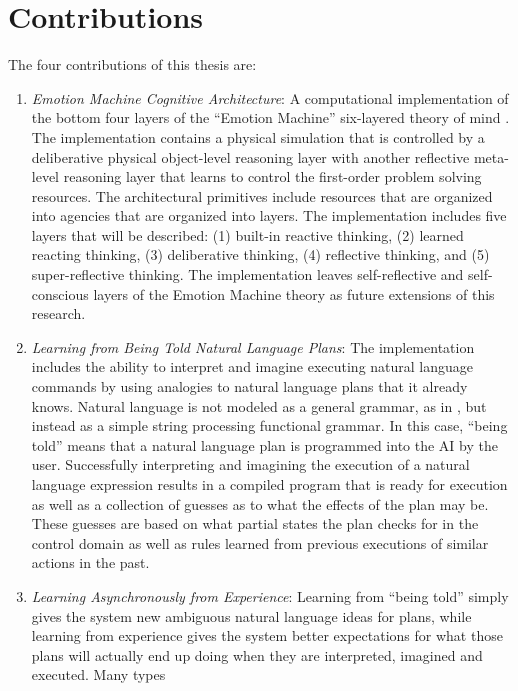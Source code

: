 \section{Contributions}

The four contributions of this thesis are:
\begin{enumerate}
\item \emph{Emotion Machine Cognitive Architecture}: A computational
  implementation of the bottom four layers of the ``Emotion Machine''
  six-layered theory of mind \cite[]{minsky:2006}.  The implementation
  contains a physical simulation that is controlled by a deliberative
  physical object-level reasoning layer with another reflective
  meta-level reasoning layer that learns to control the first-order
  problem solving resources.  The architectural primitives include
  resources that are organized into agencies that are organized into
  layers.  The implementation includes five layers that will be
  described: (1) built-in reactive thinking, (2) learned reacting
  thinking, (3) deliberative thinking, (4) reflective thinking, and
  (5) super-reflective thinking.  The implementation leaves
  self-reflective and self-conscious layers of the Emotion Machine
  theory as future extensions of this research.
\item \emph{Learning from Being Told Natural Language Plans}: The
  implementation includes the ability to interpret and imagine
  executing natural language commands by using analogies to natural
  language plans that it already knows.  Natural language is not
  modeled as a general grammar, as in \cite{winograd:1970}, but
  instead as a simple string processing functional grammar.  In this
  case, ``being told'' means that a natural language plan is
  programmed into the AI by the user.  Successfully interpreting and
  imagining the execution of a natural language expression results in
  a compiled program that is ready for execution as well as a
  collection of guesses as to what the effects of the plan may be.
  These guesses are based on what partial states the plan checks for
  in the control domain as well as rules learned from previous
  executions of similar actions in the past.
\item \emph{Learning Asynchronously from Experience}: Learning from
  ``being told'' simply gives the system new ambiguous natural
  language ideas for plans, while learning from experience gives the
  system better expectations for what those plans will actually end up
  doing when they are interpreted, imagined and executed.  Many types

\end{enumerate}
